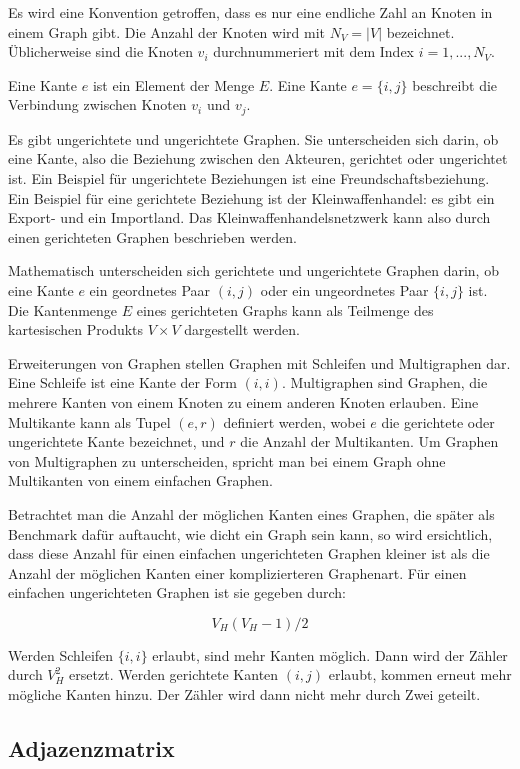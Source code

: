\documentclass[a4paper,ngerman,oneside,titlepage,bibliography=totoc,11pt]{scrreprt}
\begin{document}
Es wird eine Konvention getroffen, dass es nur eine endliche Zahl an Knoten in einem Graph gibt. Die Anzahl der Knoten wird mit $N_V = |V|$ bezeichnet. Üblicherweise sind die Knoten $v_i$ durchnummeriert mit dem Index $i = 1, ..., N_V$. 

Eine Kante $e$ ist ein Element der Menge $E$. Eine Kante $e = \{i,j\}$ beschreibt die Verbindung zwischen Knoten $v_i$ und $v_j$. 

Es gibt ungerichtete und ungerichtete Graphen. Sie unterscheiden sich darin, ob eine Kante, also die Beziehung zwischen den Akteuren, gerichtet oder ungerichtet ist. Ein Beispiel für ungerichtete Beziehungen ist eine Freundschaftsbeziehung. Ein Beispiel für eine gerichtete Beziehung ist der Kleinwaffenhandel: es gibt ein Export- und ein Importland. Das Kleinwaffenhandelsnetzwerk kann also durch einen gerichteten Graphen beschrieben werden.

Mathematisch unterscheiden sich gerichtete und ungerichtete Graphen darin, ob eine Kante $e$ ein geordnetes Paar $(i,j)$ oder ein ungeordnetes Paar $\{i,j\}$ ist. Die Kantenmenge $E$ eines gerichteten Graphs kann als Teilmenge des kartesischen Produkts $V \times V$ dargestellt werden.

Erweiterungen von Graphen stellen Graphen mit Schleifen und Multigraphen dar. Eine Schleife ist eine Kante der Form $(i,i)$. Multigraphen sind Graphen, die mehrere Kanten von einem Knoten zu einem anderen Knoten erlauben. Eine Multikante kann als Tupel $(e, r)$ definiert werden, wobei $e$ die gerichtete oder ungerichtete Kante bezeichnet, und $r$ die Anzahl der Multikanten. Um Graphen von Multigraphen zu unterscheiden, spricht man bei einem Graph ohne Multikanten von einem einfachen Graphen.

Betrachtet man die Anzahl der möglichen Kanten eines Graphen, die später als Benchmark dafür auftaucht, wie dicht ein Graph sein kann, so wird ersichtlich, dass diese Anzahl für einen einfachen ungerichteten Graphen kleiner ist als die Anzahl der möglichen Kanten einer komplizierteren Graphenart. Für einen einfachen ungerichteten Graphen ist sie gegeben durch:

$$V_H(V_H-1)/2$$

Werden Schleifen $\{i,i\}$ erlaubt, sind mehr Kanten möglich. Dann wird der Zähler durch $V_H^2$ ersetzt. Werden gerichtete Kanten $(i,j)$ erlaubt, kommen erneut mehr mögliche Kanten hinzu. Der Zähler wird dann nicht mehr durch Zwei geteilt.


\subsection{Adjazenzmatrix}
\end{document}
